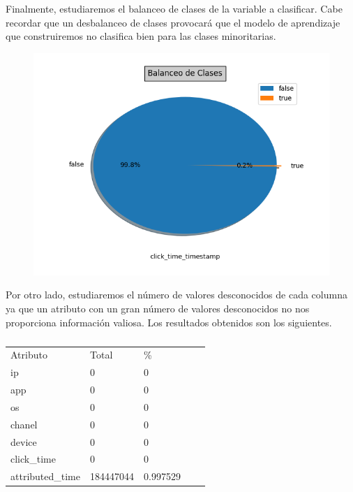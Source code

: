 Finalmente, estudiaremos el balanceo de clases de la variable a clasificar. Cabe recordar que un desbalanceo de clases provocará que el modelo de aprendizaje que construiremos no clasifica bien para las clases minoritarias.
\begin{figure}
\includegraphics[scale=0.75]{img/imbalacing.png}
\end{figure}
Por otro lado, estudiaremos el número de valores desconocidos de cada columna ya que un atributo con un gran número de valores desconocidos no nos proporciona información valiosa. Los resultados obtenidos son los siguientes.
\begin{table}[]
	\centering
	\begin{tabular}{lllll}
	Atributo& Total & \%    \\
	ip	& 0 &0 \\
	app	& 0 & 0   \\
	os	& 0 & 0 \\
	chanel &0 & 0 \\
	device & 0 & 0  \\
	click\_time& 0& 0 \\
	attributed\_time &184447044& 0.997529
	\end{tabular}
	\caption{}
\label{}
\end{table}

